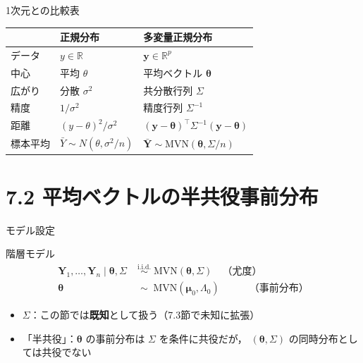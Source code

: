 \documentclass[lualatex,aspectratio=169,12pt]{beamer}
\newcommand{\mvn}{\mathrm{MVN}}
\begin{document}
\begin{frame}{1次元との比較表}
  \begin{center}
  \renewcommand{\arraystretch}{1.5}
  \begin{tabular}{lll}
  \toprule
   & 正規分布 & 多変量正規分布 \\
  \midrule
  データ & $y \in \mathbb{R}$ & $\bm{y} \in \mathbb{R}^p$ \\
  中心 & 平均 $\theta$ & 平均ベクトル $\bm{\theta}$ \\
  広がり & 分散 $\sigma^2$ & 共分散行列 $\Sigma$ \\
  精度 & $1/\sigma^2$ & 精度行列 $\Sigma^{-1}$ \\
  距離 & $(y-\theta)^2/\sigma^2$ & $(\bm{y}-\bm{\theta})^\top\Sigma^{-1}(\bm{y}-\bm{\theta})$ \\
  標本平均 & $\bar{Y} \sim N(\theta,\sigma^2/n)$ & $\bar{\bm{Y}} \sim \mvn(\bm{\theta},\Sigma/n)$ \\
  \bottomrule
  \end{tabular}
  \end{center}
\end{frame}

\section{7.2 平均ベクトルの半共役事前分布}

\begin{frame}{モデル設定}
  \begin{block}{階層モデル}
    \begin{align*}
      \bm{Y}_1, \ldots, \bm{Y}_n \mid \bm{\theta}, \Sigma
      &\;\overset{\mathrm{i.i.d.}}{\sim}\; \mvn(\bm{\theta}, \Sigma) \quad \text{（尤度）}\\
      \bm{\theta}
      &\;\sim\; \mvn(\bm{\mu}_0, \Lambda_0) \quad\quad\quad \text{（事前分布）}
    \end{align*}
  \end{block}

  \bigskip
  \begin{itemize}
    \item $\Sigma$：この節では\textbf{既知}として扱う（7.3節で未知に拡張）
    \item \alert{「半共役」}：$\bm{\theta}$ の事前分布は $\Sigma$ を条件に共役だが，
          $(\bm{\theta}, \Sigma)$ の同時分布としては共役でない
  \end{itemize}
\end{frame}
\end{document}

